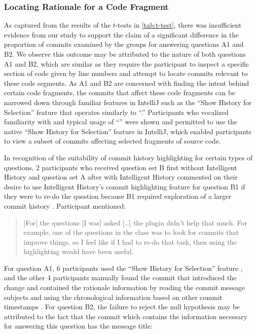 \subsubsection{Locating Rationale for a Code Fragment}

As captured from the results of the $t$-tests in \autoref{tab:t-test}, 
there was insufficient evidence from our study to support the claim of a significant difference in 
the proportion of commits examined by the groups for answering questions A1 and B2.
We observe this outcome may be attributed to the nature of both questions A1 and B2, 
which are similar as they require the participant to  inspect a specific section of code 
given by line numbers and attempt to locate commits relevant to these code segments.
As A1 and B2 are concerned with finding the intent behind certain code fragments, 
the commits that affect these code fragments can be narrowed down
through familiar features in IntelliJ such as the ``Show History for Selection'' feature 
that operates similarly to ``.''
Participants who vocalized familiarity with and typical usage of ``'' were shown and permitted to use the native 
``Show History for Selection'' feature in IntelliJ, 
which enabled participants to view a subset of commits affecting selected fragments of source code.

In recognition of the suitability of commit history highlighting for certain types of questions,
2 participants who received question set B first without Intelligent History and question set A 
after with Intelligent History commented on their desire to use Intelligent History's commit highlighting feature for question B1
if they were to re-do the question because B1 required exploration of a larger commit history .
Participant  mentioned:

\begin{quote}
  [For] the questions [I was] asked [\dots] the plugin didn’t help that much. 
  For example, one of the questions in the  class was to look for commits that improve things, 
  so I feel like if I had to re-do that task, then using the highlighting would have been useful.
\end{quote}

For question A1, 6 participants used the ``Show History for Selection'' feature ,
and the other 4 participants manually found the commit that introduced the change 
and contained the rationale information by reading the commit message subjects and using the chronological information based on other commit timestamps .
For question B2, the failure to reject the null hypothesis may be attributed to the fact that the commit  which contains the information necessary for answering this question has the message title: 


